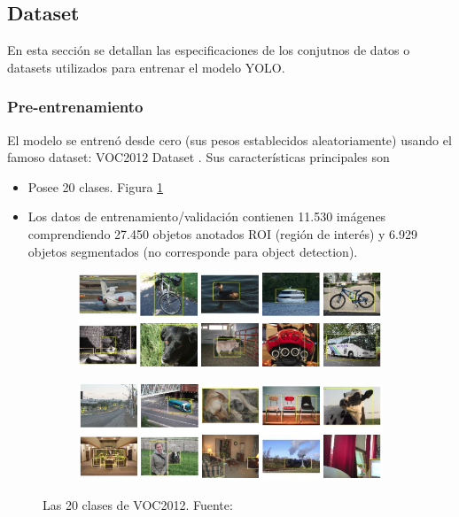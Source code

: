 \label{Dataset}
\subsection{Dataset}
En esta sección se detallan las especificaciones de los conjutnos de datos o datasets utilizados para entrenar el modelo YOLO.

\subsubsection{Pre-entrenamiento}
El modelo se entrenó desde cero (sus pesos establecidos aleatoriamente) usando el famoso dataset: VOC2012 Dataset \cite{voc2012}. Sus características principales son

\begin{itemize}
    \item Posee 20 clases. Figura \ref{fig:pascal-voc}
    \item Los datos de entrenamiento/validación contienen 11.530 imágenes comprendiendo 27.450 objetos anotados ROI (región de interés) y 6.929 objetos segmentados (no corresponde para object detection).
\end{itemize}

\begin{figure}[h!]
    \centering
    \begin{subfigure}[h]{\textwidth}
        \centering
        \includegraphics[width=\linewidth]{img/pascal-voc-20-classes-part1.png}
    \end{subfigure}
    \begin{subfigure}[h]{\textwidth}
        \centering
        \includegraphics[width=\linewidth]{img/pascal-voc-20-classes-part2.png}
    \end{subfigure}
    \caption{Las 20 clases de VOC2012. Fuente: \cite{voc2012}}
    \label{fig:pascal-voc}
\end{figure}


